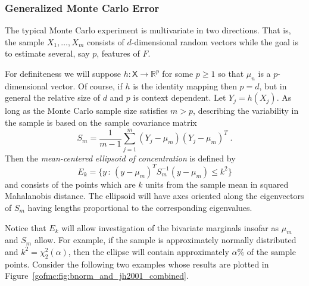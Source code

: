 \documentclass[12pt]{article}
\theoremstyle{plain}
\theoremstyle{definition}
\theoremstyle{remark}
\newcommand{\sX}{\mathsf{X}}
\newcommand{\real}{\mathbb{R}}
\begin{document}


\subsubsection{Generalized Monte Carlo Error}
The typical Monte Carlo experiment is multivariate in two directions.
That is, the sample $X_1, \ldots, X_m$ consists of $d$-dimensional
random vectors while the goal is to estimate several, say $p$,
features of $F$.

For definiteness we will suppose $h : \sX \to \real^p$ for some
$p \ge 1$ so that $\mu_n$ is a $p$-dimensional vector. Of course, if
$h$ is the identity mapping then $p=d$, but in general the relative
size of $d$ and $p$ is context dependent.  Let $Y_j = h(X_j)$. As long
as the Monte Carlo sample size satisfies $m > p$, describing the
variability in the sample is based on the sample covariance matrix
\begin{equation*}
S_m = \frac{1}{m-1} \sum_{j=1}^{m} (Y_{j} - \mu_m)(Y_{j} -
\mu_m)^{T} \; .
\end{equation*}
Then the \textit{mean-centered ellipsoid of concentration} is defined by
\begin{equation}
\label{gofmc:eq:ellipsoid of concentration}
E_k=\{ y \, : \, (y - \mu_m)^T S_m^{-1} (y - \mu_m) \le k^2 \}
\end{equation}
and consists of the points which are $k$ units from the sample mean in
squared Mahalanobis distance.  The ellipsoid will have axes oriented
along the eigenvectors of $S_m$ having lengths proportional to the
corresponding eigenvalues.

Notice that $E_k$ will allow investigation of the bivariate marginals
insofar as $\mu_m$ and $S_m$ allow. For example, if the sample is
approximately normally distributed and $k^2 = \chi^2_2 (\alpha)$, then
the ellipse will contain approximately $\alpha \%$ of the sample
points. Consider the following two examples whose results are plotted
in Figure~\ref{gofmc:fig:bnorm_and_jh2001_combined}.
\end{document}
